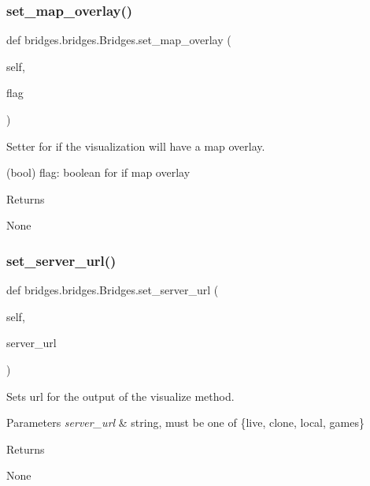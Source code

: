 \subsubsection{\texorpdfstring{set\+\_\+map\+\_\+overlay()}{set\_map\_overlay()}}
{\footnotesize\ttfamily def bridges.\+bridges.\+Bridges.\+set\+\_\+map\+\_\+overlay (\begin{DoxyParamCaption}\item[{}]{self,  }\item[{}]{flag }\end{DoxyParamCaption})}



Setter for if the visualization will have a map overlay. 

(bool) flag\+: boolean for if map overlay \begin{DoxyReturn}{Returns}


None 
\end{DoxyReturn}
\mbox{\label{classbridges_1_1bridges_1_1_bridges_a74009f2eaf24464f9769ea6166d20e59}} 
\subsubsection{\texorpdfstring{set\+\_\+server\+\_\+url()}{set\_server\_url()}}
{\footnotesize\ttfamily def bridges.\+bridges.\+Bridges.\+set\+\_\+server\+\_\+url (\begin{DoxyParamCaption}\item[{}]{self,  }\item[{}]{server\+\_\+url }\end{DoxyParamCaption})}



Sets url for the output of the visualize method. 


\begin{DoxyParams}{Parameters}
{\em server\+\_\+url} & string, must be one of \{live, clone, local, games\} \\
\hline
\end{DoxyParams}
\begin{DoxyReturn}{Returns}


None 
\end{DoxyReturn}
\mbox{\label{classbridges_1_1bridges_1_1_bridges_a3b0c629c1ae0beaac05fa9d90846c423}} 
